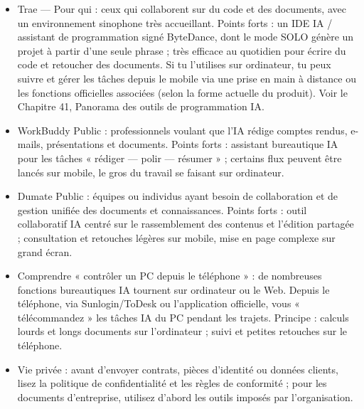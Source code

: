 \begin{itemize}
  \item Trae — Pour qui : ceux qui collaborent sur du code et des documents, avec un environnement sinophone très accueillant. Points forts : un IDE IA / assistant de programmation signé ByteDance, dont le mode SOLO génère un projet à partir d'une seule phrase ; très efficace au quotidien pour écrire du code et retoucher des documents. Si tu l'utilises sur ordinateur, tu peux suivre et gérer les tâches depuis le mobile via une prise en main à distance ou les fonctions officielles associées (selon la forme actuelle du produit). Voir le Chapitre 41, Panorama des outils de programmation IA.
  \item WorkBuddy Public : professionnels voulant que l'IA rédige comptes rendus, e-mails, présentations et documents. Points forts : assistant bureautique IA pour les tâches « rédiger — polir — résumer » ; certains flux peuvent être lancés sur mobile, le gros du travail se faisant sur ordinateur.
  \item Dumate Public : équipes ou individus ayant besoin de collaboration et de gestion unifiée des documents et connaissances. Points forts : outil collaboratif IA centré sur le rassemblement des contenus et l'édition partagée ; consultation et retouches légères sur mobile, mise en page complexe sur grand écran.
  \item Comprendre « contrôler un PC depuis le téléphone » : de nombreuses fonctions bureautiques IA tournent sur ordinateur ou le Web. Depuis le téléphone, via Sunlogin/ToDesk ou l'application officielle, vous « télécommandez » les tâches IA du PC pendant les trajets. Principe : calculs lourds et longs documents sur l'ordinateur ; suivi et petites retouches sur le téléphone.
  \item Vie privée : avant d'envoyer contrats, pièces d'identité ou données clients, lisez la politique de confidentialité et les règles de conformité ; pour les documents d'entreprise, utilisez d'abord les outils imposés par l'organisation.
\end{itemize}



